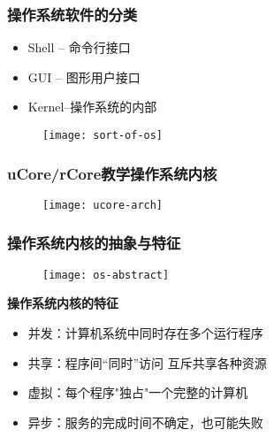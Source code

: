 %
%
%
%

\begin{frame}[plain]
	\frametitle{操作系统软件的分类}
		\begin{itemize}
		\item Shell -- 命令行接口
		\item GUI -- 图形用户接口
		\item Kernel--操作系统的内部
	\end{itemize}
	\begin{figure}
		\centering
		\texttt{[image: sort-of-os]}
	\end{figure}
\end{frame}

\begin{frame}[plain]
	\frametitle{uCore/rCore教学操作系统内核}
	\begin{figure}
		\centering
		\texttt{[image: ucore-arch]}
	\end{figure}
\end{frame}



\begin{frame}[plain]
	\frametitle{操作系统内核的抽象与特征}
	\begin{figure}
	\centering
	\texttt{[image: os-abstract]}
\end{figure} \pause
	\textbf{操作系统内核的特征}
	\begin{itemize}
		\item 并发：计算机系统中同时存在多个运行程序 %
		\item 共享：程序间“同时”访问 互斥共享各种资源 %
		\item 虚拟：每个程序"独占"一个完整的计算机 %
		\item 异步：服务的完成时间不确定，也可能失败
	\end{itemize}

\end{frame}


